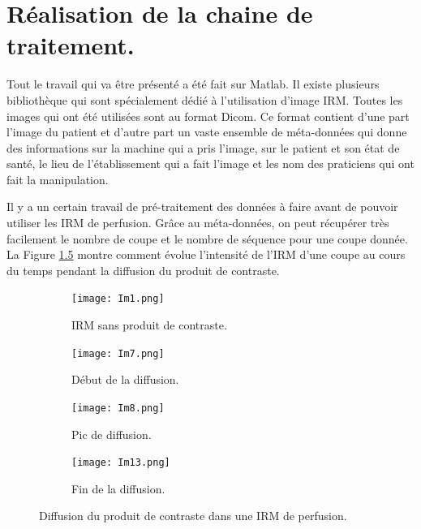 \chapter{Réalisation de la chaine de traitement.}

Tout le travail qui va être présenté a été fait sur Matlab. Il existe plusieurs bibliothèque qui sont spécialement dédié à l'utilisation d'image IRM. Toutes les images qui ont été utilisées sont au format Dicom. Ce format contient d'une part l'image du patient et d'autre part un vaste ensemble de méta-données qui donne des informations sur la machine qui a pris l'image, sur le patient et son état de santé, le lieu de l'établissement qui a fait l'image et les nom des praticiens qui ont fait la manipulation.

\medskip

Il y a un certain travail de pré-traitement des données à faire avant de pouvoir utiliser les IRM de perfusion. Grâce au méta-données, on peut récupérer très facilement le nombre de coupe et le nombre de séquence pour une coupe donnée. La Figure \ref{fig:diffusion} montre comment évolue l'intensité de l'IRM d'une coupe au cours du temps pendant la diffusion du produit de contraste.


\begin{figure}[H]
\centering
\begin{subfigure}[t]{0.3\textwidth}
\centering
    \vspace{0.00\textheight}
    \texttt{[image: Im1.png]}
    \caption{IRM sans produit de contraste.}
    \label{fig:without} 
\end{subfigure}
\begin{subfigure}[t]{0.3\textwidth}
\centering
    \vspace{0.00\textheight}
    \texttt{[image: Im7.png]}
    \caption{Début de la diffusion.}
    \label{fig:First} 
\end{subfigure}
\begin{subfigure}[t]{0.3\textwidth}
\centering
    \vspace{0.00\textheight}
    \texttt{[image: Im8.png]}
    \caption{Pic de diffusion.}
    \label{fig:Second} 
\end{subfigure}
\begin{subfigure}[t]{0.3\textwidth}
\centering
    \vspace{0.00\textheight}
    \texttt{[image: Im13.png]}
    \caption{Fin de la diffusion.}
    \label{fig:Last} 
\end{subfigure}
    \caption{Diffusion du produit de contraste dans une IRM de perfusion.}
    \label{fig:diffusion} 
\end{figure}

